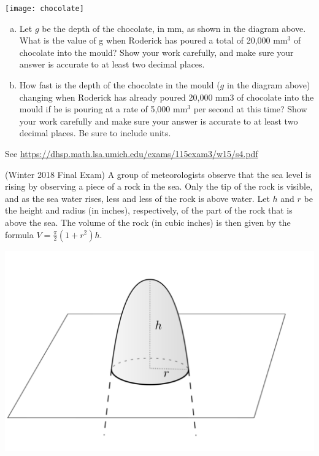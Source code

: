 \documentclass[11pt]{exam}
\begin{document}
\begin{questions}
\vspace{-1em}
\begin{center}
  \texttt{[image: chocolate]}
\end{center}
\vspace{-1em}
\begin{enumerate}[(a)]
\item Let $g$ be the depth of the chocolate, in mm, as shown in the diagram above. What is the value of g when Roderick has poured a total of 20,000 mm$^3$ of chocolate into the mould? Show your work carefully, and make sure your answer is accurate to at least two decimal places.
\item How fast is the depth of the chocolate in the mould ($g$ in the diagram above) changing when Roderick has already poured 20,000 mm3 of chocolate into the mould if he is pouring at a rate of 5,000 mm$^3$ per second at this time? Show your work carefully and make sure your answer is accurate to at least two decimal places. Be sure to include units.
\end{enumerate}
\begin{solution}
  See \href{https://dhsp.math.lsa.umich.edu/exams/115exam3/w15/s4.pdf}{https://dhsp.math.lsa.umich.edu/exams/115exam3/w15/s4.pdf}
\end{solution}
\question (Winter 2018 Final Exam) %
A group of meteorologists observe that the sea level is rising by observing a piece of a rock in the sea. Only the tip of the rock is visible, and as the sea water rises, less and less of the rock is above water. Let $h$ and $r$ be the height and radius (in inches), respectively, of the part of the rock that is above the sea. The volume of the rock (in cubic inches) is then given by the formula $V = \frac{\pi}{2} (1+r^2)h$.
\vspace{-1em}
\begin{center}
  \includegraphics[scale=0.4]{rock.png}

\end{center}
\end{questions}
\end{document}
